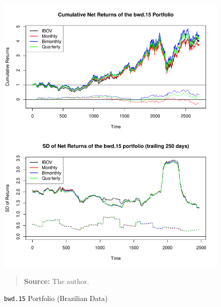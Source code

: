 \documentclass[preprint, doubleblind, authoryear,10pt]{elsarticle}
\begin{document}
\begin{figure}[htpb]
\centering
\footnotesize
\caption{\texttt{bwd.15} Portfolio (Brazilian Data)}
\label{fig:ibov:bwd.15}
\includegraphics[width=.95\linewidth]{./figs/IBOV-retac-bwd-15.pdf}
\begin{quote}
\textbf{Source:} The author.
\end{quote}
\end{figure}
\end{document}
